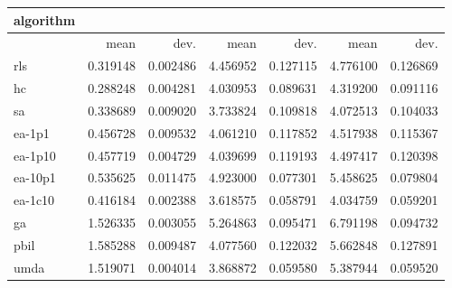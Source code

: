 \begin{tabular}{@{}l*{6}{>{{}}N{1}{2}}@{}}
\toprule
{algorithm} &  &  &  \\
\midrule
& {mean} & {dev.} & {mean} & {dev.} & {mean} & {dev.} \\
\midrule
rls & 0.319148 & 0.002486 & 4.456952 & 0.127115 & 4.776100 & 0.126869 \\
 hc & 0.288248 & 0.004281 & 4.030953 & 0.089631 & 4.319200 & 0.091116 \\
 sa & 0.338689 & 0.009020 & 3.733824 & 0.109818 & 4.072513 & 0.104033 \\
 ea-1p1 & 0.456728 & 0.009532 & 4.061210 & 0.117852 & 4.517938 & 0.115367 \\
 ea-1p10 & 0.457719 & 0.004729 & 4.039699 & 0.119193 & 4.497417 & 0.120398 \\
 ea-10p1 & 0.535625 & 0.011475 & 4.923000 & 0.077301 & 5.458625 & 0.079804 \\
 ea-1c10 & 0.416184 & 0.002388 & 3.618575 & 0.058791 & 4.034759 & 0.059201 \\
 ga & 1.526335 & 0.003055 & 5.264863 & 0.095471 & 6.791198 & 0.094732 \\
 pbil & 1.585288 & 0.009487 & 4.077560 & 0.122032 & 5.662848 & 0.127891 \\
 umda & 1.519071 & 0.004014 & 3.868872 & 0.059580 & 5.387944 & 0.059520 \\
 \bottomrule
\end{tabular}
